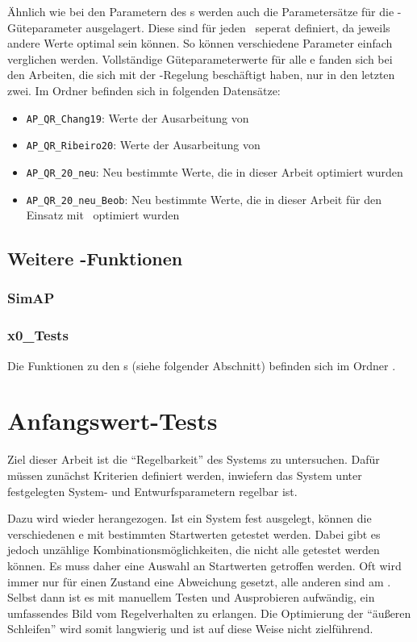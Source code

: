 Ähnlich wie bei den Parametern des \spd s werden auch die Parametersätze für die \ricc-Güteparameter ausgelagert.
Diese sind für jeden \ap\ seperat definiert, da jeweils andere Werte optimal sein können.
So können verschiedene Parameter einfach verglichen werden.
Vollständige Güteparameterwerte für alle \ap e fanden sich bei den Arbeiten, die sich mit der \ap-Regelung beschäftigt haben, nur in den letzten zwei.
Im Ordner  befinden sich in folgenden Datensätze:
\begin{itemize}
	\item \texttt{AP\_QR\_Chang19}: Werte der Ausarbeitung von \cite{chang}
	\item \texttt{AP\_QR\_Ribeiro20}: Werte der Ausarbeitung von \cite{ribeiro}
	\item \texttt{AP\_QR\_20\_neu}: Neu bestimmte Werte, die in dieser Arbeit optimiert wurden
	\item \texttt{AP\_QR\_20\_neu\_Beob}: Neu bestimmte Werte, die in dieser Arbeit für den Einsatz mit \beob\ optimiert wurden
\end{itemize}


\subsection{Weitere \Matlab-Funktionen}

\subsubsection{SimAP}

\subsubsection{x0\_Tests}
Die Funktionen zu den \xots s (siehe folgender Abschnitt) befinden sich im Ordner .


\section{Anfangswert-Tests}\label{sec:x0test}

Ziel dieser Arbeit ist die "`Regelbarkeit"' des Systems zu untersuchen.
Dafür müssen zunächst Kriterien definiert werden, inwiefern das System unter festgelegten System- und Entwurfsparametern regelbar ist.

Dazu wird wieder  herangezogen.
Ist ein System fest ausgelegt, können die verschiedenen \ap e mit bestimmten Startwerten getestet werden.
Dabei gibt es jedoch unzählige Kombinationsmöglichkeiten, die nicht alle getestet werden können.
Es muss daher eine Auswahl an Startwerten getroffen werden.
Oft wird immer nur für einen Zustand eine Abweichung gesetzt, alle anderen sind am \ap.
Selbst dann ist es mit manuellem Testen und Ausprobieren aufwändig, ein umfassendes Bild vom Regelverhalten zu erlangen.
Die Optimierung der "`äußeren Schleifen"' wird somit langwierig und ist auf diese Weise nicht zielführend.

